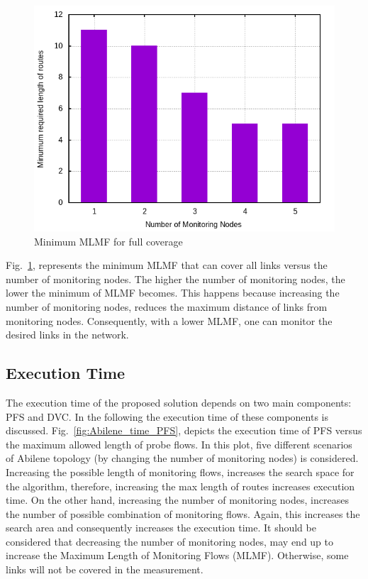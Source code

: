 \documentclass[10pt, journal, letterpaper]{IEEEtran}
\begin{document}
\begin{figure}
    \centering
    \includegraphics[width=0.8\columnwidth]{img/eval_bar_min_length_of_routes_with_different_monitoring_nodes.png}
    \caption{Minimum MLMF for full coverage}
    \label{fig:bar_min_MLMF_full_cover}
\end{figure}
Fig.~\ref{fig:bar_min_MLMF_full_cover}, represents the minimum MLMF that can cover all links versus the number of monitoring nodes. The higher the number of monitoring nodes, the lower the minimum of MLMF becomes. This happens because increasing the number of monitoring nodes, reduces the maximum distance of links from monitoring nodes. Consequently, with a lower MLMF, one can monitor the desired links in the network. %

\subsection{Execution Time}\label{subsec:eval_exec_time}
The execution time of the proposed solution depends on two main components: PFS and DVC. In the following the execution time of these components is discussed. Fig.~\ref{fig:Abilene_time_PFS}, depicts the execution time of PFS versus the maximum allowed length of probe flows. In this plot, five different scenarios of Abilene topology (by changing the number of monitoring nodes) is considered. Increasing the possible length of monitoring flows, increases the search space for the algorithm, therefore, increasing the max length of routes increases execution time. On the other hand, increasing the number of monitoring nodes, increases the number of possible combination of monitoring flows. Again, this increases the search area and consequently increases the execution time. It should be considered that decreasing the number of monitoring nodes, may end up to increase the Maximum Length of Monitoring Flows (MLMF). Otherwise, some links will not be covered in the measurement.
\end{document}
